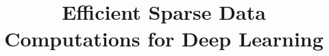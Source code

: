 \documentclass[pageno]{jpaper}
\begin{document}
\title{Efficient Sparse Data Computations for Deep Learning}
\date{}
\maketitle
\thispagestyle{empty}

\setlength{\belowdisplayskip}{5pt} \setlength{\belowdisplayshortskip}{5pt}
\setlength{\abovedisplayskip}{5pt} \setlength{\abovedisplayshortskip}{5pt}





%
%










\end{document}

